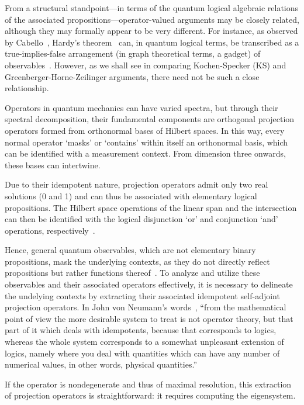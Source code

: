 \documentclass[
  twocolumn,
 showpacs,
 showkeys,
 preprintnumbers,
 amsmath,amssymb,
 aps,
 pra,
  longbibliography,
 floatfix,
 ]{revtex4-2}
\begin{document}
From a structural standpoint---in terms of the quantum logical algebraic relations of the associated propositions---operator-valued arguments may be closely related, although they may formally appear to be very different. For instance, as observed by Cabello~\cite{cabello-96,Cabello-2013-Hardylike}, Hardy's theorem~\cite{Hardy-92,Hardy-93} can, in quantum logical terms, be transcribed as a true-implies-false arrangement (in graph theoretical terms, a gadget) of observables~\cite{2018-minimalYIYS,svozil-2020-hardy}.
However, as we shall see in comparing Kochen-Specker (KS) and Greenberger-Horne-Zeilinger arguments, there need not be such a close relationship.


Operators in quantum mechanics can have varied spectra, but through their spectral decomposition,
their fundamental components are orthogonal projection operators formed from orthonormal bases of Hilbert spaces.
In this way, every normal operator `masks' or `contains' within itself an orthonormal basis, which
can be identified with a measurement context. From dimension three onwards, these bases can intertwine.

Due to their idempotent nature, projection operators admit only two real solutions (0 and 1) and can thus be associated with elementary logical propositions. The Hilbert space operations of the linear span and the intersection can then be identified with the logical disjunction `or' and conjunction `and' operations, respectively~\cite{birkhoff-36,vonNeumann2018Feb}.

Hence, general quantum observables, which are not elementary binary propositions,
mask the underlying contexts, as they do not directly reflect propositions but rather functions thereof~\cite[\S~82]{halmos-vs}.
To analyze and utilize these observables and their associated operators effectively,
it is necessary to delineate the undelying contexts by extracting their associated idempotent self-adjoint projection operators.
In John von Neumann's words~\cite[pp.~241, 242]{vonNeumann2001},
``from the mathematical point of view the more desirable system to treat is not operator theory,
but that part of it which deals with idempotents, because that corresponds to logics,
whereas the whole system corresponds to a somewhat unpleasant extension
of logics, namely where you deal with quantities which can have any number of numerical values,
in other words, physical quantities.''

If the operator is nondegenerate and thus of maximal resolution, this extraction of projection operators is straightforward: it requires computing the eigensystem.
\end{document}
